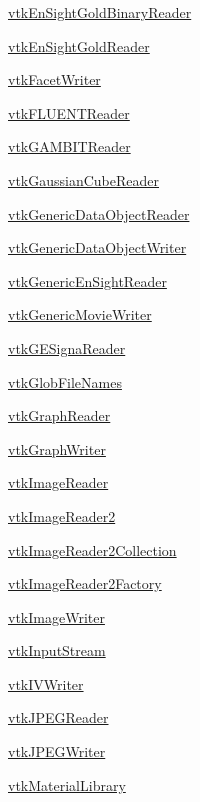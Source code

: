 \begin{DoxyItemize}
\item \hyperlink{vtkio_vtkensightgoldbinaryreader}{vtk\-En\-Sight\-Gold\-Binary\-Reader}  
\item \hyperlink{vtkio_vtkensightgoldreader}{vtk\-En\-Sight\-Gold\-Reader}  
\item \hyperlink{vtkio_vtkfacetwriter}{vtk\-Facet\-Writer}  
\item \hyperlink{vtkio_vtkfluentreader}{vtk\-F\-L\-U\-E\-N\-T\-Reader}  
\item \hyperlink{vtkio_vtkgambitreader}{vtk\-G\-A\-M\-B\-I\-T\-Reader}  
\item \hyperlink{vtkio_vtkgaussiancubereader}{vtk\-Gaussian\-Cube\-Reader}  
\item \hyperlink{vtkio_vtkgenericdataobjectreader}{vtk\-Generic\-Data\-Object\-Reader}  
\item \hyperlink{vtkio_vtkgenericdataobjectwriter}{vtk\-Generic\-Data\-Object\-Writer}  
\item \hyperlink{vtkio_vtkgenericensightreader}{vtk\-Generic\-En\-Sight\-Reader}  
\item \hyperlink{vtkio_vtkgenericmoviewriter}{vtk\-Generic\-Movie\-Writer}  
\item \hyperlink{vtkio_vtkgesignareader}{vtk\-G\-E\-Signa\-Reader}  
\item \hyperlink{vtkio_vtkglobfilenames}{vtk\-Glob\-File\-Names}  
\item \hyperlink{vtkio_vtkgraphreader}{vtk\-Graph\-Reader}  
\item \hyperlink{vtkio_vtkgraphwriter}{vtk\-Graph\-Writer}  
\item \hyperlink{vtkio_vtkimagereader}{vtk\-Image\-Reader}  
\item \hyperlink{vtkio_vtkimagereader2}{vtk\-Image\-Reader2}  
\item \hyperlink{vtkio_vtkimagereader2collection}{vtk\-Image\-Reader2\-Collection}  
\item \hyperlink{vtkio_vtkimagereader2factory}{vtk\-Image\-Reader2\-Factory}  
\item \hyperlink{vtkio_vtkimagewriter}{vtk\-Image\-Writer}  
\item \hyperlink{vtkio_vtkinputstream}{vtk\-Input\-Stream}  
\item \hyperlink{vtkio_vtkivwriter}{vtk\-I\-V\-Writer}  
\item \hyperlink{vtkio_vtkjpegreader}{vtk\-J\-P\-E\-G\-Reader}  
\item \hyperlink{vtkio_vtkjpegwriter}{vtk\-J\-P\-E\-G\-Writer}  
\item \hyperlink{vtkio_vtkmateriallibrary}{vtk\-Material\-Library}  

\end{DoxyItemize}
